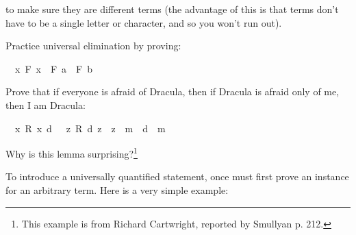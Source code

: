 \begin{isabellebody}
\begin{isamarkuptext}
to make sure they are different terms (the advantage of this is that terms don't have to be a single
letter or character, and so you won't run out).%
\end{isamarkuptext}\isamarkuptrue%
%
\begin{isamarkuptext}%
\begin{Exercise} Practice universal elimination by proving: \end{Exercise}%
\end{isamarkuptext}\isamarkuptrue%
\isamarkupfalse%
\ {\isachardoublequoteopen}{\isacharparenleft}{\isasymforall}\ x{\isachardot}\ F\ x{\isacharparenright}\ {\isasymlongrightarrow}\ F\ a\ {\isasymand}\ F\ b{\isachardoublequoteclose}%
\isadelimproof
\ %
\endisadelimproof
%
\isatagproof
{}\isamarkupfalse%
%
\endisatagproof
{\isafoldproof}%
%
\isadelimproof
%
\endisadelimproof
%
\begin{isamarkuptext}%
\begin{Exercise}[title = The Riddle of Dracula, label = dracula]
Prove that if everyone is afraid of Dracula, then if Dracula is afraid only of me, then I am Dracula: \end{Exercise}%
\end{isamarkuptext}\isamarkuptrue%
\isamarkupfalse%
\ {\isachardoublequoteopen}{\isacharparenleft}{\isasymforall}\ x{\isachardot}\ R\ x\ d{\isacharparenright}\ {\isasymlongrightarrow}\ {\isacharparenleft}{\isasymforall}\ z{\isachardot}\ R\ d\ z\ {\isasymlongrightarrow}\ z\ {\isacharequal}\ m{\isacharparenright}\ {\isasymlongrightarrow}\ d\ {\isacharequal}\ m{\isachardoublequoteclose}%
\isadelimproof
\ %
\endisadelimproof
%
\isatagproof
{}\isamarkupfalse%
%
\endisatagproof
{\isafoldproof}%
%
\isadelimproof
%
\endisadelimproof
%
\begin{isamarkuptext}%
Why is this lemma surprising?\footnote{This example is from Richard Cartwright, reported by
Smullyan \cite{smullyan_what_1978} p. 212.}%
\end{isamarkuptext}\isamarkuptrue%
%
\isadelimdocument
%
\endisadelimdocument
%
\isatagdocument
%
\isamarkuptrue%
%
\endisatagdocument
{\isafolddocument}%
%
\isadelimdocument
%
\endisadelimdocument
%
\begin{isamarkuptext}%
To introduce a universally quantified statement, once must first prove an instance for an
arbitrary term. Here is a very simple example:%
\end{isamarkuptext}\isamarkuptrue%
\isamarkupfalse%

\end{isabellebody}
